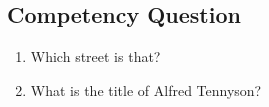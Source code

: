 \subsection{Competency Question}
\label{cqs:Stubs}
\begin{enumerate}[CQ1.]
\item Which street is that?
\item What is the title of Alfred Tennyson?
\end{enumerate}

\newpage
